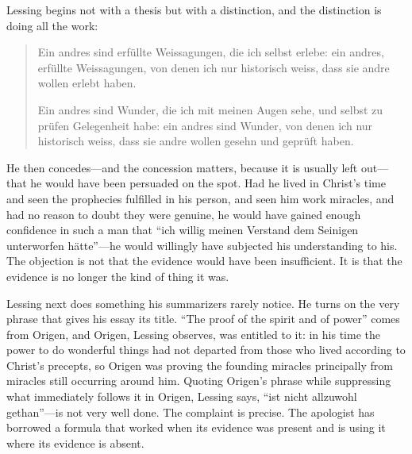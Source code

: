 Lessing begins not with a thesis but with a distinction, and the distinction is doing all the work:

\begin{quote}\small
Ein andres sind erf\"ullte Weissagungen, die ich selbst erlebe: ein andres, erf\"ullte Weissagungen, von denen ich nur historisch weiss, dass sie andre wollen erlebt haben.

Ein andres sind Wunder, die ich mit meinen Augen sehe, und selbst zu pr\"ufen Gelegenheit habe: ein andres sind Wunder, von denen ich nur historisch weiss, dass sie andre wollen gesehn und gepr\"uft haben.
\end{quote}

He then concedes---and the concession matters, because it is usually left out---that he would have been persuaded on the spot. Had he lived in Christ's time and seen the prophecies fulfilled in his person, and seen him work miracles, and had no reason to doubt they were genuine, he would have gained enough confidence in such a man that ``ich willig meinen Verstand dem Seinigen unterworfen h\"atte''---he would willingly have subjected his understanding to his. The objection is not that the evidence would have been insufficient. It is that the evidence is no longer the kind of thing it was.

Lessing next does something his summarizers rarely notice. He turns on the very phrase that gives his essay its title. ``The proof of the spirit and of power'' comes from Origen, and Origen, Lessing observes, was entitled to it: in his time the power to do wonderful things had not departed from those who lived according to Christ's precepts, so Origen was proving the founding miracles principally from miracles still occurring around him. Quoting Origen's phrase while suppressing what immediately follows it in Origen, Lessing says, ``ist nicht allzuwohl gethan''---is not very well done. The complaint is precise. The apologist has borrowed a formula that worked when its evidence was present and is using it where its evidence is absent.

